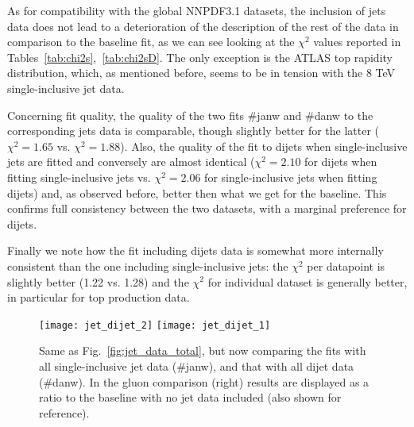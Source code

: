 %
As for compatibility with the global NNPDF3.1 datasets, the inclusion of jets data does not lead to a deterioration
of the description of the rest of the data in comparison to the baseline fit, as we can see looking at the $\chi^2$
values reported in Tables~\ref{tab:chi2s},~\ref{tab:chi2sD}.
The only exception is the ATLAS top rapidity distribution, which, as mentioned before,
seems to be in tension with the 8 TeV single-inclusive jet data.

%
Concerning fit quality, the quality of the two fits \#janw and \#danw to the corresponding jets data is comparable,
though slightly better for the latter ($\chi^2=1.65$ vs. $\chi^2=1.88$). Also, the quality of the fit to dijets 
when single-inclusive jets are fitted and conversely are almost identical ($\chi^2=2.10$ for dijets when fitting
single-inclusive jets vs. $\chi^2=2.06$ for single-inclusive jets when fitting dijets) and, as observed before,
better then what we get for the baseline.
This confirms full consistency between the two datasets, with a marginal preference for dijets.

%
Finally we note how the fit including dijets data is somewhat more internally consistent than the one including
single-inclusive jets: the $\chi^2$ per datapoint is slightly better (1.22 vs. 1.28) and the $\chi^2$ for individual
dataset is generally better, in particular for top production data.

\begin{figure}[!t]
    \centering
    \texttt{[image: jet\_dijet\_2]}
    \texttt{[image: jet\_dijet\_1]}\\
    \caption{Same as Fig.~\ref{fig:jet_data_total}, but now comparing the
      fits with  all single-inclusive jet data (\#janw), and that with all
      dijet data (\#danw).
      In the gluon comparison (right) results are
      displayed as a ratio to the baseline with no jet data included (also
      shown for reference).}
    \label{fig:jet_dijet_1}
\end{figure}

